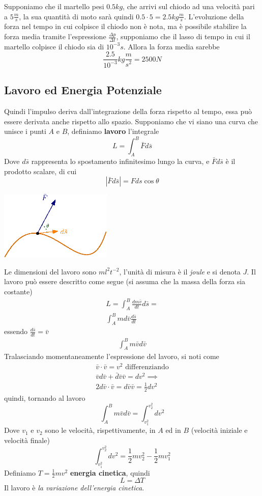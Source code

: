 \documentclass[10pt, letterpaper]{report}
\begin{document}
Supponiamo che il martello pesi $0.5kg$, che arrivi sul chiodo ad una velocità pari a $5\frac{m}{s}$, la sua quantità 
di moto sarà quindi $0.5\cdot 5=2.5kg\frac{m}{s}$. L'evoluzione della forza nel tempo in cui colpisce il chiodo non è 
nota, ma è possibile stabilire la forza media tramite l'espressione $\frac{\Delta p}{\Delta t}$, supponiamo che 
il lasso di tempo in cui il martello colpisce il chiodo sia di $10^{-3}s$. Allora la forza media sarebbe 
$$ \frac{2.5}{10^{-3}}kg\frac{m}{s^2}=2500N$$
\subsection{Lavoro ed Energia Potenziale}
Quindi l'impulso deriva dall'integrazione della forza rispetto al 
tempo, essa può essere derivata anche rispetto allo spazio.
Supponiamo che vi siano una curva che unisce i punti $A$ e $B$, 
definiamo \textbf{lavoro} l'integrale 
$$ L=\int_A^B\bar Fd\bar s$$
Dove $d\bar s$ rappresenta lo spostamento infinitesimo lungo la curva, e 
$\bar Fd\bar s$ è il prodotto scalare, di cui 
$$ |\bar Fd\bar s|=Fds\cos\theta$$\begin{center}
    \includegraphics[width=0.4\textwidth]{images/lavoro.eps}
\end{center}
Le dimensioni del lavoro sono $ml^2t^{-2}$, l'unità di misura 
è il \textit{joule} e si denota $J$. Il lavoro può 
essere descritto come segue (si assuma che la massa della forza 
sia costante) 
\begin{eqnarray}
    L=\int_A^B\frac{dm\bar v}{dt}d\bar s = \\ 
    \int_A^Bmd\bar v\frac{d\bar s}{dt}
\end{eqnarray}
essendo $\frac{d\bar s}{dt}=\bar v$
\begin{eqnarray}
    \int_A^Bm\bar vd\bar v
\end{eqnarray}
Tralasciando momentaneamente l'espressione del lavoro, si noti come 
\begin{eqnarray}
    \bar v \cdot \bar v =  v^2 \text{ differenziando}\\ 
    \bar vd\bar v+\bar d\bar v\bar v=d v^2 \implies \\ 
    2d\bar v \cdot \bar v =d\bar v \bar v = \frac{1}{2}dv^2
\end{eqnarray}
quindi, tornando al lavoro
$$
    \int_A^Bm\bar vd\bar v=\int_{v_1^2}^{v_2^2}dv^2
$$
Dove $v_1$ e $v_2$ sono le velocità, rispettivamente, in $A$ ed 
in $B$ (velocità iniziale e velocità finale)$$ 
\int_{v_1^2}^{v_2^2}dv^2=\frac{1}{2}mv_2^2-\frac{1}{2}mv_1^2
$$
Definiamo $T=\frac{1}{2}mv^2$ \textbf{energia cinetica}, quindi 
$$ L=\Delta T$$
Il lavoro è \textit{la variazione dell'energia cinetica}.
\end{document}
